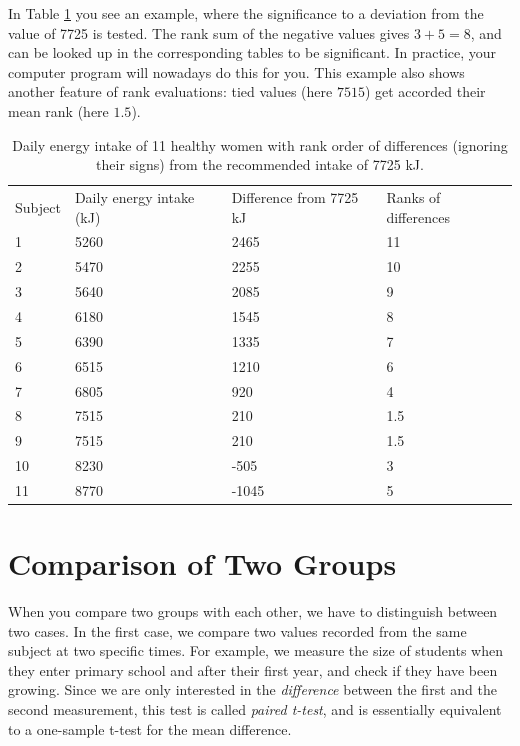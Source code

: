 In Table \ref{tab:wilcoxon} you see an example, where the significance to a deviation from the value of 7725 is tested. The rank sum of the negative values gives $3+5=8$, and can be looked up in the corresponding tables to be significant. In practice, your computer program will nowadays do this for you. This example also shows another feature of rank evaluations: tied values (here $7515$) get accorded their mean rank (here $1.5$).

\begin{table}
  \centering
  \begin{tabular}{l p{2cm} p{2cm} p{2cm}}
     \hline
     Subject & Daily energy intake (kJ) & Difference from 7725 kJ & Ranks of differences \\
     1 & 5260 & 2465 & 11 \\
     2 & 5470 & 2255 & 10 \\
     3 & 5640 & 2085 & 9 \\
     4 & 6180 & 1545 & 8 \\
     5 & 6390 & 1335 & 7 \\
     6 & 6515 & 1210 & 6 \\
     7 & 6805 & 920 & 4 \\
     8 & 7515 & 210 & 1.5 \\
     9 & 7515 & 210 & 1.5 \\
     10 & 8230 & -505 & 3 \\
     11 & 8770 & -1045 & 5 \\
     \hline
   \end{tabular}
  \caption{Daily energy intake of 11 healthy women with rank order of differences (ignoring their signs) from the recommended intake of 7725 kJ.}\label{tab:wilcoxon}
\end{table}


\section{Comparison of Two Groups} 

When you compare two groups with each other, we have to distinguish between two cases. In the first case, we compare two values recorded from the same subject at two specific times. For example, we measure the size of students when they enter primary school and after their first year, and check if they have been growing. Since we are only interested in the \emph{difference} between the first and the second measurement, this test is called \emph{paired t-test}, and is essentially equivalent to a one-sample t-test for the mean difference.


